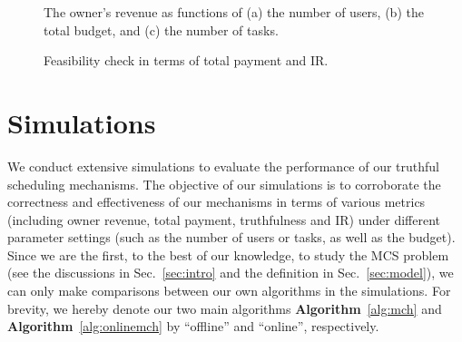 \documentclass[10pt,journal,compsoc]{IEEEtran}
\begin{document}
  \begin{figure*}[htb]
\begin{center}
    \end{center} \vspace{-1.5ex}
    \caption{The owner's revenue as functions of (a) the number of users, (b) the total budget, and (c) the number of tasks.}
    \label{fig:revenue} \end{figure*}
\begin{figure*}[htb]
\begin{center}
    \end{center} \vspace{-1.5ex}
    \caption{Feasibility check in terms of total payment and IR.}
    \label{fig:IR} \vspace{-2ex}
  \end{figure*}

\section{Simulations} \label{sec:simu}
We conduct extensive simulations to evaluate the performance of our truthful scheduling mechanisms. The objective of our simulations is to corroborate the correctness and effectiveness of our mechanisms in terms of various metrics (including owner revenue, total payment, truthfulness and IR) under different parameter settings (such as the number of users or tasks, as well as the budget). Since we are the first, to the best of our knowledge, to study the MCS problem (see the discussions in Sec.~\ref{sec:intro} and the definition in Sec.~\ref{sec:model}), we can only make comparisons between our own algorithms in the simulations. For brevity, we hereby denote our two main algorithms \textbf{Algorithm}~\ref{alg:mch} and \textbf{Algorithm}~\ref{alg:onlinemch} by ``\textsf{offline}'' and ``\textsf{online}'', respectively.
\end{document}
